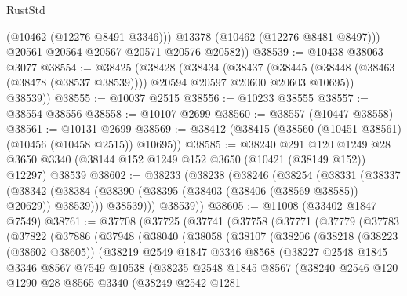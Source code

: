 \begin{lexlean}{RustStd}
\begin{coremodule}
            (@10462 (@12276 @8491 @3346)))
          @13378
          (@10462 (@12276 @8481 @8497)))
        @20561
        @20564
        @20567
        @20571
        @20576
        @20582))
@38539 := @10438 @38063 @3077
@38554 := @38425
    (@38428
      (@38434
        (@38437
          (@38445 (@38448 (@38463 (@38478 (@38537 @38539)))) @20594 @20597 @20600 @20603 @10695))
        @38539))
@38555 := @10037 @2515
@38556 := @10233 @38555
@38557 := @38554 @38556
@38558 := @10107 @2699
@38560 := @38557 (@10447 @38558)
@38561 := @10131 @2699
@38569 := @38412 (@38415 (@38560 (@10451 @38561) (@10456 (@10458 @2515)) @10695))
@38585 := @38240
    @291
    @120
    @1249
    @28
    @3650
    @3340
    (@38144 @152 @1249 @152 @3650 (@10421 (@38149 @152)) @12297)
    @38539
@38602 := @38233
    (@38238
      (@38246
        (@38254
          (@38331
            (@38337
              (@38342 (@38384 (@38390 (@38395 (@38403 (@38406 (@38569 @38585)) @20629)) @38539)))
              @38539)))
        @38539))
@38605 := @11008 (@33402 @1847 @7549)
@38761 := @37708
    (@37725
      (@37741
        (@37758
          (@37771
            (@37779
              (@37783
                (@37822
                  (@37886
                    (@37948
                      (@38040
                        (@38058
                          (@38107
                            (@38206
                              (@38218
                                (@38223 (@38602 @38605))
                                (@38219
                                  @2549
                                  @1847
                                  @3346
                                  @8568
                                  (@38227
                                    @2548
                                    @1845
                                    @3346
                                    @8567
                                    @7549
                                    @10538
                                    (@38235
                                      @2548
                                      @1845
                                      @8567
                                      (@38240
                                        @2546
                                        @120
                                        @1290
                                        @28
                                        @8565
                                        @3340
                                        (@38249
                                          @2542
                                          @1281

\end{coremodule}
\end{lexlean}

